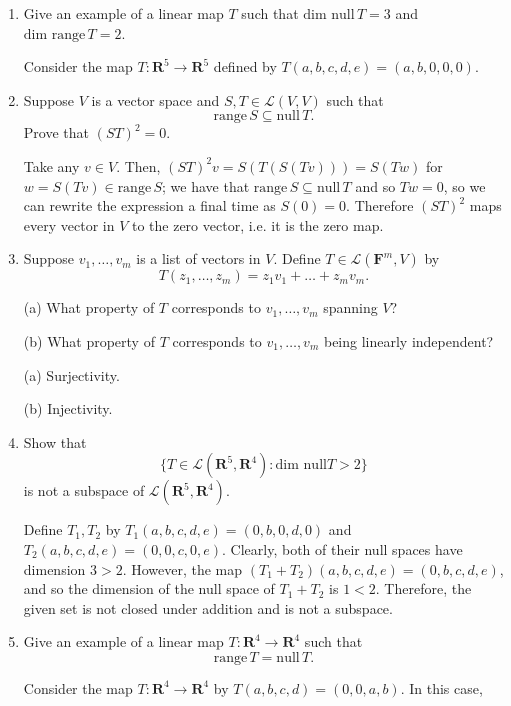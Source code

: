 \documentclass{book}
\begin{document}
\begin{enumerate}

\item Give an example of a linear map \(T\) such that \(\textrm{dim null} \, T=3\) and \(\textrm{dim range} \, T=2\).

Consider the map \(T: \textbf{R}^5 \rightarrow \textbf{R}^5\) defined by \(T(a,b,c,d,e)=(a,b,0,0,0)\).

\item Suppose \(V\) is a vector space and \(S,T \in \mathcal{L}(V,V)\) such that \[\textrm{range} \, S \subseteq \textrm{null} \, T.\] Prove that \((ST)^2=0\).

Take any \(v \in V\).  Then, \((ST)^2v=S(T(S(Tv)))=S(Tw)\) for \(w=S(Tv) \in \textrm{range} \, S\); we have that \(\textrm{range} \, S \subseteq \textrm{null} \, T\) and so \(Tw=0\), so we can rewrite the expression a final time as \(S(0)=0\).  Therefore \((ST)^2\) maps every vector in \(V\) to the zero vector, i.e. it is the zero map.

\item Suppose \(v_1,\dots,v_m\) is a list of vectors in \(V\).  Define \(T \in \mathcal{L}(\textbf{F}^m,V)\) by \[T(z_1,\dots,z_m)=z_1v_1+\dots+z_mv_m.\]

(a) What property of \(T\) corresponds to \(v_1,\dots,v_m\) spanning \(V\)?

(b) What property of \(T\) corresponds to \(v_1,\dots,v_m\) being linearly independent?

(a) Surjectivity.

(b) Injectivity.

\item Show that \[\{T \in \mathcal{L}(\textbf{R}^5,\textbf{R}^4): \textrm{dim null} T > 2\}\] is not a subspace of \(\mathcal{L}(\textbf{R}^5,\textbf{R}^4)\).

Define \(T_1,T_2\) by \(T_1(a,b,c,d,e)=(0,b,0,d,0)\) and \(T_2(a,b,c,d,e)=(0,0,c,0,e)\).  Clearly, both of their null spaces have dimension \(3>2\).  However, the map \((T_1+T_2)(a,b,c,d,e)=(0,b,c,d,e)\), and so the dimension of the null space of \(T_1+T_2\) is \(1<2\).  Therefore, the given set is not closed under addition and is not a subspace.

\item Give an example of a linear map \(T: \textbf{R}^4 \rightarrow \textbf{R}^4\) such that \[\textrm{range} \, T =\textrm{null} \, T.\]

Consider the map \(T: \textbf{R}^4 \rightarrow \textbf{R}^4\) by \(T(a,b,c,d)=(0,0,a,b)\).  In this case,


\end{enumerate}
\end{document}
